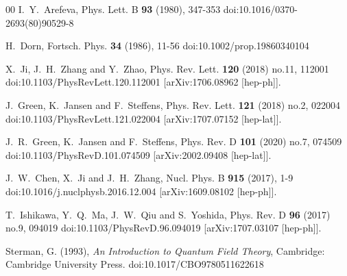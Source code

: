 \documentclass[preprint,12pt]{elsarticle}
\begin{document}
\begin{thebibliography}{00}
I.~Y.~Arefeva,
Phys. Lett. B \textbf{93} (1980), 347-353
doi:10.1016/0370-2693(80)90529-8

H.~Dorn,
Fortsch. Phys. \textbf{34} (1986), 11-56
doi:10.1002/prop.19860340104

X.~Ji, J.~H.~Zhang and Y.~Zhao,
Phys. Rev. Lett. \textbf{120} (2018) no.11, 112001
doi:10.1103/PhysRevLett.120.112001
[arXiv:1706.08962 [hep-ph]].

J.~Green, K.~Jansen and F.~Steffens,
Phys. Rev. Lett. \textbf{121} (2018) no.2, 022004
doi:10.1103/PhysRevLett.121.022004
[arXiv:1707.07152 [hep-lat]].

J.~R.~Green, K.~Jansen and F.~Steffens,
Phys. Rev. D \textbf{101} (2020) no.7, 074509
doi:10.1103/PhysRevD.101.074509
[arXiv:2002.09408 [hep-lat]].

J.~W.~Chen, X.~Ji and J.~H.~Zhang,
Nucl. Phys. B \textbf{915} (2017), 1-9
doi:10.1016/j.nuclphysb.2016.12.004
[arXiv:1609.08102 [hep-ph]].

T.~Ishikawa, Y.~Q.~Ma, J.~W.~Qiu and S.~Yoshida,
Phys. Rev. D \textbf{96} (2017) no.9, 094019
doi:10.1103/PhysRevD.96.094019
[arXiv:1707.03107 [hep-ph]].

Sterman, G. (1993), \emph{An Introduction to Quantum Field Theory}, Cambridge: Cambridge University Press. doi:10.1017/CBO9780511622618


\end{thebibliography}
\end{document}
